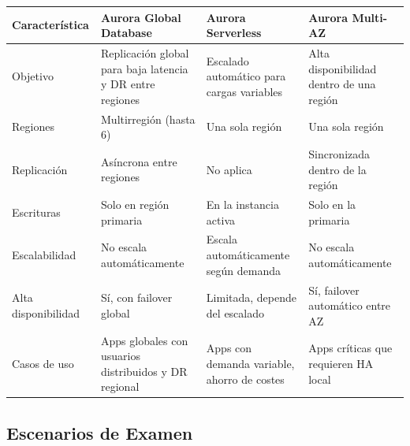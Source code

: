 \documentclass[12pt,a4paper]{report}
\begin{document}
\begin{center}
\begin{longtable}{|p{2.5cm}|p{4cm}|p{3.5cm}|p{4.5cm}|}
\hline
\cellcolor{awsblue!20}\textbf{Característica} & \cellcolor{awsblue!20}\textbf{Aurora Global Database} & \cellcolor{awsblue!20}\textbf{Aurora Serverless} & \cellcolor{awsblue!20}\textbf{Aurora Multi-AZ} \\
\hline
Objetivo & Replicación global para baja latencia y DR entre regiones & Escalado automático para cargas variables & Alta disponibilidad dentro de una región \\
\hline
Regiones & Multirregión (hasta 6) & Una sola región & Una sola región \\
\hline
Replicación & Asíncrona entre regiones & No aplica & Sincronizada dentro de la región \\
\hline
Escrituras & Solo en región primaria & En la instancia activa & Solo en la primaria \\
\hline
Escalabilidad & No escala automáticamente & Escala automáticamente según demanda & No escala automáticamente \\
\hline
Alta disponibilidad & Sí, con failover global & Limitada, depende del escalado & Sí, failover automático entre AZ \\
\hline
Casos de uso & Apps globales con usuarios distribuidos y DR regional & Apps con demanda variable, ahorro de costes & Apps críticas que requieren HA local \\
\hline
\end{longtable}
\end{center}

\subsection{Escenarios de Examen}
\end{document}
